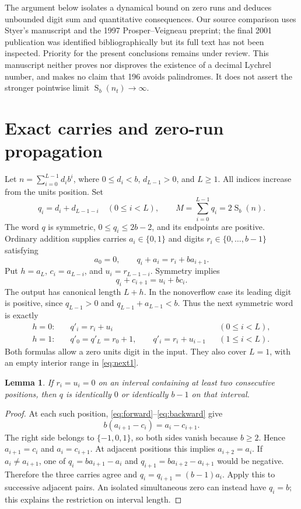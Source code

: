 \documentclass[11pt]{article}
\newtheorem{lemma}[theorem]{Lemma}
\newcommand{\ds}{\operatorname{S}}
\begin{document}
The argument below isolates a dynamical bound on zero runs and deduces
unbounded digit sum and quantitative consequences. Our source comparison
uses Styer's manuscript and the 1997 Prosper--Veigneau preprint; the final
2001 publication \cite{pvpublished} was identified bibliographically but
its full text has not been inspected. Priority for the present conclusions
remains under review. This manuscript neither proves nor disproves the
existence of a decimal Lychrel number, and makes no claim that 196 avoids
palindromes. It does not assert the stronger pointwise limit
$\ds_b(n_t)\to\infty$.

\section{Exact carries and zero-run propagation}
Let $n=\sum_{i=0}^{L-1}d_i b^i$, where $0\leq d_i<b$,
$d_{L-1}>0$, and $L\geq1$. All indices increase from the units position.
Set
\[
 q_i=d_i+d_{L-1-i}\quad(0\leq i<L),\qquad
 M=\sum_{i=0}^{L-1}q_i=2\ds_b(n).
\]
The word $q$ is symmetric, $0\leq q_i\leq2b-2$, and its endpoints are
positive. Ordinary addition supplies carries $a_i\in\{0,1\}$ and digits
$r_i\in\{0,\ldots,b-1\}$ satisfying
\begin{equation}\label{eq:forward}
 a_0=0,\qquad q_i+a_i=r_i+b a_{i+1}.
\end{equation}
Put $h=a_L$, $c_i=a_{L-i}$, and $u_i=r_{L-1-i}$. Symmetry implies
\begin{equation}\label{eq:backward}
 q_i+c_{i+1}=u_i+b c_i.
\end{equation}
The output has canonical length $L+h$. In the nonoverflow case its
leading digit is positive, since $q_{L-1}>0$ and
$q_{L-1}+a_{L-1}<b$. Thus the next symmetric word is exactly
\begin{align}
 h=0:\quad &q'_i=r_i+u_i &&(0\leq i<L),\label{eq:next0}\\
 h=1:\quad &q'_0=q'_L=r_0+1,\qquad
 q'_i=r_i+u_{i-1} &&(1\leq i<L).\label{eq:next1}
\end{align}
Both formulas allow a zero units digit in the input. They also cover
$L=1$, with an empty interior range in \eqref{eq:next1}.

\begin{lemma}\label{lem:local}
If $r_i=u_i=0$ on an interval containing at least two consecutive
positions, then $q$ is identically $0$ or identically $b-1$ on that interval.
\end{lemma}
\begin{proof}
At each such position, \eqref{eq:forward}--\eqref{eq:backward} give
\[
 b(a_{i+1}-c_i)=a_i-c_{i+1}.
\]
The right side belongs to $\{-1,0,1\}$, so both sides vanish because
$b\geq2$. Hence $a_{i+1}=c_i$ and $a_i=c_{i+1}$. At adjacent positions
this implies $a_{i+2}=a_i$. If $a_i\ne a_{i+1}$, one of
$q_i=b a_{i+1}-a_i$ and $q_{i+1}=b a_{i+2}-a_{i+1}$ would be negative.
Therefore the three carries agree and
$q_i=q_{i+1}=(b-1)a_i$. Apply this to successive adjacent pairs.
An isolated simultaneous zero can instead have $q_i=b$; this explains
the restriction on interval length.
\end{proof}
\end{document}
